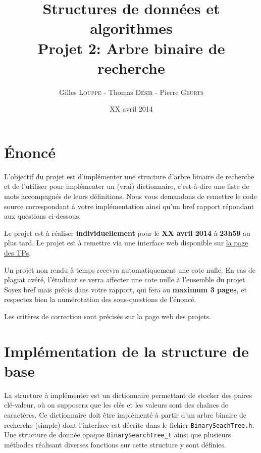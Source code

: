 \documentclass[a4paper,10pt]{article}
\title{
    \textbf{Structures de données et algorithmes}\\
    Projet 2: Arbre binaire de recherche
}
\author{Gilles \textsc{Louppe} - Thomas \textsc{Désir} - Pierre \textsc{Geurts}}
\date{XX avril 2014}
\begin{document}
\maketitle

\section*{\'Enoncé}

L'objectif du projet est d'implémenter une structure d'arbre binaire de
recherche et de l'utiliser pour implémenter un (vrai) dictionnaire,
c'est-à-dire une liste de mots accompagnés de leurs définitions. Nous vous
demandons de remettre le code source correspondant à votre implémentation ainsi
qu'un bref rapport répondant aux questions ci-dessous.

Le projet est à réaliser {\bf individuellement} pour le {\bf XX avril   2014} à
{\bf 23h59} au plus tard. Le projet est à remettre via une interface web
disponible sur \href{http://www.montefiore.ulg.ac.be/~glouppe/2013-2014/students.info0902.php}{la page des TPs}.

Un projet non rendu à temps recevra automatiquement une cote nulle. En cas de
plagiat avéré, l'étudiant se verra affecter une cote nulle à l'ensemble du
projet. Soyez bref mais précis dans votre rapport, qui fera au \textbf{maximum 3 pages},
et respectez bien la numérotation des sous-questions de l'énoncé.

Les critères de correction sont précisés sur la page web des projets.

\section{Implémentation de la structure de base}

La structure à implémenter est un dictionnaire permettant de stocker des paires
clé-valeur, où on supposera que les clés et les valeurs sont des chaînes de
caractères. Ce dictionnaire doit être implémenté à partir d'un arbre binaire de
recherche (simple) dont l'interface est décrite dans le fichier
\texttt{BinarySeachTree.h}. Une structure de donnée opaque
\texttt{BinarySearchTree\_t} ainsi que plusieurs méthodes réalisant diverses
fonctions sur cette structure y sont définies.
\end{document}
